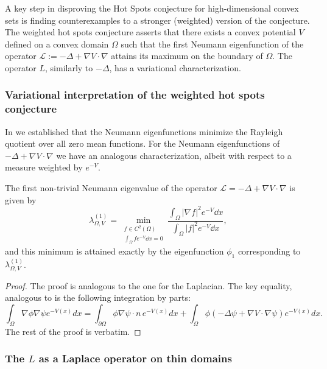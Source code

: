 A key step in disproving the Hot Spots conjecture for high-dimensional convex sets is finding counterexamples to a stronger (weighted) version of the conjecture. The weighted hot spots conjecture asserts that there exists a convex potential \( V \) defined on a convex domain \( \Omega \) such that the first Neumann eigenfunction of the operator \( \mathcal{L} := -\Delta + \nabla V \cdot \nabla \) attains its maximum on the boundary of \( \Omega \). The operator $L$, similarly to $-\Delta$, has a variational characterization.


\subsubsection*{Variational interpretation of the weighted hot spots conjecture}

In  we established that the Neumann eigenfunctions minimize the Rayleigh quotient over all zero mean functions. For the Neumann eigenfunctions of $-\Delta + \nabla V \cdot \nabla$ we have an analogous characterization, albeit with respect to a measure weighted by $e^{-V}$.

\begin{proposition} \label{prop:var_char}
The first non-trivial Neumann eigenvalue of the operator $\mathcal{L} = -\Delta + \nabla V \cdot \nabla$ is given by
\[
    \lambda^{(1)}_{\Omega, V} = \min_{\substack{f \in C^2(\Omega) \\ \int_\Omega f e^{-V} \dd{x} = 0}} \frac{\int_\Omega |\nabla f|^2 e^{-V} \dd{x}}{\int_\Omega |f|^2 e^{-V} \dd{x}},
\]
and this minimum is attained exactly by the eigenfunction $\phi_1$ corresponding to \( \lambda^{(1)}_{\Omega, V} \).
\end{proposition}
\begin{proof}
The proof is analogous to the one for the Laplacian. The key equality, analogous to  is the following integration by parts:
$$
\int_{\Omega} \nabla \phi \nabla \psi e^{-V(x)} dx = \int_{\partial \Omega} \phi \nabla \psi \cdot n \, e^{-V(x)} dx + \int_{\Omega} \phi (-\Delta \psi + \nabla V \cdot \nabla \psi) e^{-V(x)} dx.
$$
The rest of the proof is verbatim.
\end{proof}


\subsubsection*{The $L$ as a Laplace operator on thin domains}


